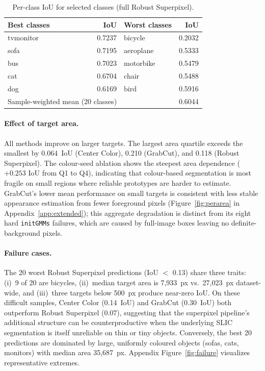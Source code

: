 \begin{table}[ht]
\centering
\caption{Per-class IoU for selected classes (full Robust Superpixel).}
\label{tab:stratified}
\begin{tabular}{lrlr}
\toprule
Best classes & IoU & Worst classes & IoU \\
\midrule
tvmonitor & 0.7237 & bicycle & 0.2032 \\
sofa & 0.7195 & aeroplane & 0.5333 \\
bus & 0.7023 & motorbike & 0.5479 \\
cat & 0.6704 & chair & 0.5488 \\
dog & 0.6169 & bird & 0.5916 \\
\midrule
\multicolumn{2}{l}{Sample-weighted mean (20 classes)} & \multicolumn{2}{r}{0.6044} \\
\bottomrule
\end{tabular}
\end{table}

\paragraph{Effect of target area.}
All methods improve on larger targets. The largest area quartile exceeds the smallest by 0.064~IoU (Center Color), 0.210 (GrabCut), and 0.118 (Robust Superpixel). The colour-seed ablation shows the steepest area dependence ($+0.253$ IoU from Q1 to Q4), indicating that colour-based segmentation is most fragile on small regions where reliable prototypes are harder to estimate. GrabCut's lower mean performance on small targets is consistent with less stable appearance estimation from fewer foreground pixels (Figure~\ref{fig:perarea} in Appendix~\ref{app:extended}); this aggregate degradation is distinct from its eight hard \texttt{initGMMs} failures, which are caused by full-image boxes leaving no definite-background pixels.

\paragraph{Failure cases.}
The 20 worst Robust Superpixel predictions (IoU $<$ 0.13) share three traits: (i)~9 of 20 are bicycles, (ii)~median target area is 7,933~px vs.\ 27,023~px dataset-wide, and (iii)~three targets below 500~px produce near-zero IoU. On these difficult samples, Center Color (0.14~IoU) and GrabCut (0.30~IoU) both outperform Robust Superpixel (0.07), suggesting that the superpixel pipeline's additional structure can be counterproductive when the underlying SLIC segmentation is itself unreliable on thin or tiny objects. Conversely, the best 20 predictions are dominated by large, uniformly coloured objects (sofas, cats, monitors) with median area 35,687~px. Appendix Figure~\ref{fig:failure} visualizes representative extremes.

